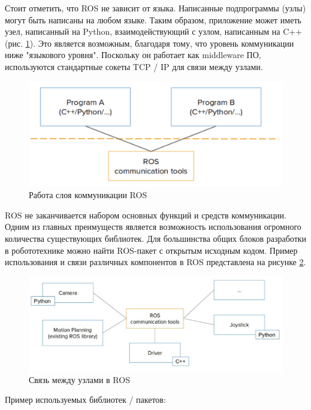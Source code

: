 Стоит отметить, что ROS не зависит от языка. Написанные подпрограммы (узлы) могут быть написаны на любом языке. Таким образом, приложение может иметь узел, написанный на Python, взаимодействующий с узлом, написанным на C++ (рис. \ref{img:roslang}). Это является возможным, благодаря тому, что уровень коммуникации ниже "языкового уровня"{}. Поскольку он работает как middleware ПО, используются стандартные сокеты TCP / IP для связи между узлами.

\begin{figure}[h!]
	\centering
	\includegraphics[width = 0.8\linewidth]{img/roslang}
	\caption{Работа слоя коммуникации ROS}
	\label{img:roslang}
\end{figure}

ROS не заканчивается набором основных функций и средств коммуникации. Одним из главных преимуществ является возможность использования огромного количества существующих библиотек. Для большинства общих блоков разработки в робототехнике можно найти ROS-пакет с открытым исходным кодом. Пример использования и связи различных компонентов в ROS представлена на рисунке \ref{img:rospackets}.

\begin{figure}[h!]
	\centering
	\includegraphics[width = \linewidth]{img/rospackets}
	\caption{Связь между узлами в ROS}
	\label{img:rospackets}
\end{figure}

Пример используемых библиотек / пакетов:

